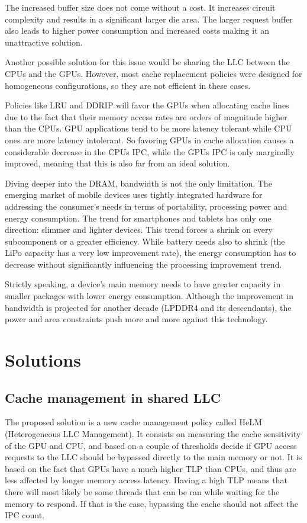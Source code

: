 \documentclass[10pt,journal,compsoc]{IEEEtran}
\begin{document}
The increased buffer size does not come without a cost. It increases circuit complexity and results in a significant larger die area. The larger request buffer also leads to higher power consumption and increased costs \cite{SmS} making it an unattractive solution. 

Another possible solution for this issue would be sharing the LLC between the CPUs and the GPUs. However, most cache replacement policies were designed for homogeneous configurations, so they are not efficient in these cases.

Policies like LRU and DDRIP will favor the GPUs when allocating cache lines due to the fact that their memory access rates are orders of magnitude higher than the CPUs. GPU applications tend to be more latency tolerant while CPU ones are more latency intolerant. So favoring GPUs in cache allocation causes a considerable decrease in the CPUs IPC, while the GPUs IPC is only marginally improved, meaning that this is also far from an ideal solution.

Diving deeper into the DRAM, bandwidth is not the only limitation. The emerging market of mobile devices uses tightly integrated hardware for addressing the consumer's needs in terms of portability, processing power and energy consumption. The trend for smartphones and tablets has only one direction: slimmer and lighter devices. This trend forces a shrink on every subcomponent or a greater efficiency. While battery needs also to shrink (the LiPo capacity has a very low improvement rate), the energy consumption has to decrease without significantly influencing the processing improvement trend. 

Strictly speaking, a device's main memory needs to have greater capacity in smaller packages with lower energy consumption. Although the improvement in bandwidth is projected for another decade (LPDDR4 and its descendants), the power and area constraints push more and more against this technology.

\section{Solutions}
\subsection{Cache management in shared LLC}
The proposed solution is a new cache management policy called HeLM (Heterogeneous LLC Management). It consists on measuring the cache sensitivity of the GPU and CPU, and based on a couple of thresholds decide if GPU access requests to the LLC should be bypassed directly to the main memory or not.
It is based on the fact that GPUs have a much higher TLP than CPUs, and thus are less affected by longer memory access latency. Having a high TLP means that there will most likely be some threads that can be ran while waiting for the memory to respond. If that is the case, bypassing the cache should not affect the IPC count.
\end{document}
